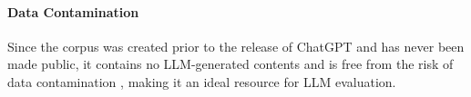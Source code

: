 \paragraph{Data Contamination} Since the corpus was created prior to the release of ChatGPT and has never been made public, it contains no LLM-generated contents and is free from the risk of data contamination \citep{jacovi-etal-2023-stop, sainz-etal-2023-nlp}, making it an ideal resource for LLM evaluation.



